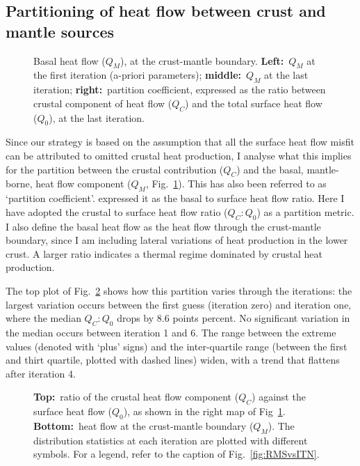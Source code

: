 \subsection{Partitioning of heat flow between crust and mantle sources}
\label{ss:Appl:DiscTherm:Partition}

\begin{figure}
	\begin{adjustbox}{center}
	\end{adjustbox}
	\caption[Basal heat flow at the crust-mantle boundary.]{Basal heat flow ($Q_M$), at the crust-mantle boundary. \textbf{Left:}~$Q_M$ at the first iteration (a-priori parameters); \textbf{middle:}~$Q_M$ at the last iteration; \textbf{right:}~partition coefficient, expressed as the ratio between crustal component of heat flow ($Q_C$) and the total surface heat flow ($Q_0$), at the last iteration.}
	\label{fig:QM}
\end{figure}

Since our strategy is based on the assumption that all the surface heat flow misfit can be attributed to omitted crustal heat production, I analyse what this implies for the partition between the crustal contribution ($Q_C$) and the basal, mantle-borne, heat flow component ($Q_M$, Fig.~\ref{fig:QM}).
This has also been referred to as `partition coefficient'. \textcite{Hasterok2016} expressed it as the basal to surface heat flow ratio.
Here I have adopted the crustal to surface heat flow ratio ($Q_C:Q_0$) as a partition metric.
I also define the basal heat flow as the heat flow through the crust-mantle boundary, since I am including lateral variations of heat production in the lower crust.
A larger ratio indicates a thermal regime dominated by crustal heat production.

The top plot of Fig.~\ref{fig:QMvsITN} shows how this partition varies through the iterations: the largest variation occurs between the first guess (iteration zero) and iteration one, where the median $Q_C:Q_0$ drops by $8.6$ points percent.
No significant variation in the median occurs between iteration 1 and 6.
The range between the extreme values (denoted with `plus' signs) and the inter-quartile range (between the first and thirt quartile, plotted with dashed lines) widen, with a trend that flattens after iteration 4.

\begin{figure}
	\begin{adjustbox}{center}
	\end{adjustbox}
	\caption[Partition ratio and heat flow at the crust-mantle boundary.]{\textbf{Top:}~ratio of the crustal heat flow component ($Q_C$) against the surface heat flow ($Q_0$), as shown in the right map of Fig~\ref{fig:QM}. \textbf{Bottom:}~heat flow at the crust-mantle boundary ($Q_M$). The distribution statistics at each iteration are plotted with different symbols. For a legend, refer to the caption of Fig.~\ref{fig:RMSvsITN}.}
	\label{fig:QMvsITN}
\end{figure}

